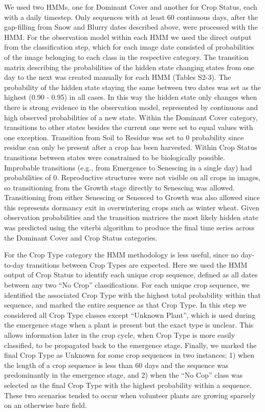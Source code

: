 \documentclass[remotesensing,article,submit,moreauthors,pdftex]{Definitions/mdpi}
\begin{document}
We used two HMMs, one for Dominant Cover and another for Crop Status, each with a daily timestep. Only sequences with at least 60 continuous days, after the gap-filling from Snow and Blurry dates described above, were processed with the HMM. For the observation model within each HMM we used the direct output from the classification step, which for each image date consisted of probabilities of the image belonging to each class in the respective category. The transition matrix describing the probabilities of the hidden state changing states from one day to the next was created manually for each HMM (Tables S2-3). The probability of the hidden state staying the same between two dates was set as the highest (0.90 - 0.95) in all cases. In this way the hidden state only changes when there is strong evidence in the observation model, represented by continuous and high observed probabilities of a new state. Within the Dominant Cover category, transitions to other states besides the current one were set to equal values with one exception. Transition from Soil to Residue was set to 0 probability since residue can only be present after a crop has been harvested. Within Crop Status transitions between states were constrained to be biologically possible. Improbable transitions (e.g., from Emergence to Senescing in a single day) had probabilities of 0. Reproductive structures were not visible on all crops in images, so transitioning from the Growth stage directly to Senescing was allowed. Transitioning from either Senescing or Senesced to Growth was also allowed since this represents dormancy exit in overwintering crops such as winter wheat. Given observation probabilities and the transition matrices the most likely hidden state was predicted using the viterbi algorithm to produce the final time series across the Dominant Cover and Crop Status categories. 

For the Crop Type category the HMM methodology is less useful, since no day-to-day transitions between Crop Types are expected. Here we used the HMM output of Crop Status to identify each unique crop sequence, defined as all dates between any two “No Crop” classifications. For each unique crop sequence, we identified the associated Crop Type with the highest total probability within that sequence, and marked the entire sequence as that Crop Type. In this step we considered all Crop Type classes except “Unknown Plant”, which is used during the emergence stage when a plant is present but the exact type is unclear. This allows information later in the crop cycle, when Crop Type is more easily classified, to be propagated back to the emergence stage. Finally, we marked the final Crop Type as Unknown for some crop sequences in two instances: 1) when the length of a crop sequence is less than 60 days and the sequence was predominantly in the emergence stage, and 2) when the “No Cop” class was selected as the final Crop Type with the highest probability within a sequence. These two scenarios tended to occur when volunteer plants are growing sparsely on an otherwise bare field. 
\end{document}
